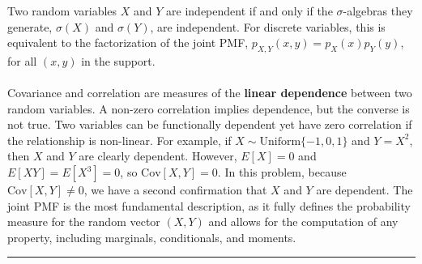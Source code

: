 \documentclass{article}
\begin{document}
\subsubsection*{}
Two random variables $X$ and $Y$ are independent if and only if the $\sigma$-algebras they generate, $\sigma(X)$ and $\sigma(Y)$, are independent. For discrete variables, this is equivalent to the factorization of the joint PMF, $p_{X,Y}(x,y) = p_X(x)p_Y(y)$, for all $(x,y)$ in the support.
\\ \\
Covariance and correlation are measures of the \textbf{linear dependence} between two random variables. A non-zero correlation implies dependence, but the converse is not true. Two variables can be functionally dependent yet have zero correlation if the relationship is non-linear. For example, if $X \sim \text{Uniform}\{-1, 0, 1\}$ and $Y=X^2$, then $X$ and $Y$ are clearly dependent. However, $E[X]=0$ and $E[XY]=E[X^3]=0$, so $\text{Cov}[X,Y]=0$. In this problem, because $\text{Cov}[X,Y] \neq 0$, we have a second confirmation that $X$ and $Y$ are dependent. The joint PMF is the most fundamental description, as it fully defines the probability measure for the random vector $(X, Y)$ and allows for the computation of any property, including marginals, conditionals, and moments.

\noindent\rule{\textwidth}{0.4pt}\\
\end{document}
